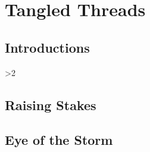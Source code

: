 \documentclass[a4paper,openany]{book}
\begin{document}
%

\glsunsetall


\printglossary[
  style=topicmcols,
]

\pagebreak
\printglossary[
  type=symbols,
  ]

\printglossary[
  type=mech,
  style=topicmcols,
  ]

\mainmatter




\glsresetall
\clearpage


\chapter{Tangled Threads}

\section{Introductions}
\begin{multicols}{2}
\ifnum\value{cycle}>2
  
  
  
  
\else
  
  
  
  
\fi
\end{multicols}

\section{Raising Stakes}
\begin{multicols}{2}



\end{multicols}

\section{Eye of the Storm}

\begin{multicols}{2}


\end{multicols}


\begin{multicols}{2}


\end{multicols}
\end{document}
